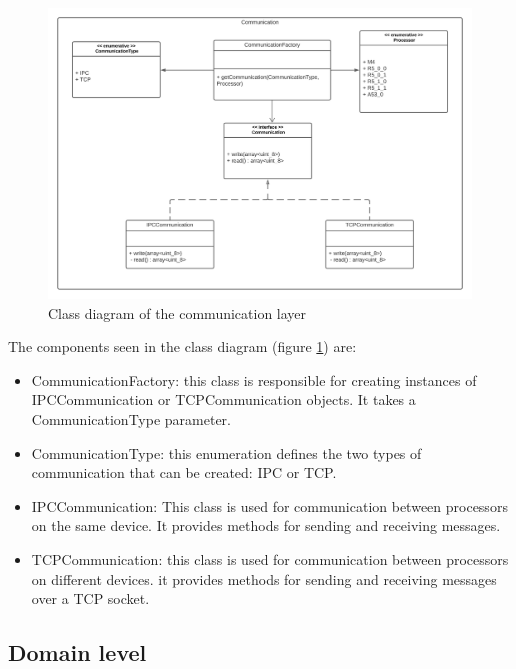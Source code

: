 \begin{figure}[H]
    \centering
    \includegraphics[width=1.0\textwidth]{Figures/class_diagram_communication.png}
    \caption{Class diagram of the communication layer}
    \label{fig:class_diagram_communication}
\end{figure}

The components seen in the class diagram
(figure \ref{fig:class_diagram_communication}) are:

\begin{itemize}
    \item   CommunicationFactory: this class is responsible for creating
            instances of IPCCommunication or TCPCommunication objects. It takes
            a CommunicationType parameter.
    \item   CommunicationType: this enumeration defines the two types of
            communication that can be created: IPC or TCP.
    \item   IPCCommunication: This class is used for communication between
            processors on the same device. It provides methods for sending and
            receiving messages.
    \item   TCPCommunication: this class is used for communication between
            processors on different devices. it provides methods for sending
            and receiving messages over a TCP socket.
\end{itemize}

\subsection{Domain level}

